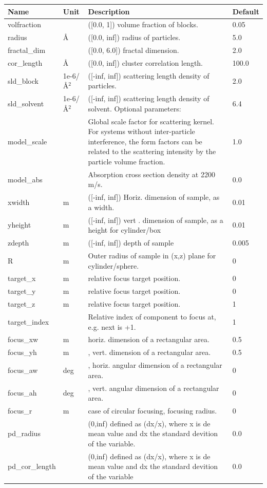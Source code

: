 \begin{longtable}{p{}p{}p{}p{}}
\toprule
\textbf{Name} & \textbf{Unit} & \textbf{Description} & \textbf{Default} \\
\midrule
\endhead
volfraction &  & ([0.0, 1]) volume fraction of blocks. & 0.05 \\
radius & \AA{} & ([0.0, inf]) radius of particles. & 5.0 \\
fractal\_dim &  & ([0.0, 6.0]) fractal dimension. & 2.0 \\
cor\_length & \AA{} & ([0.0, inf]) cluster correlation length. & 100.0 \\
sld\_block & 1e-6/\AA{}$^{2}$ & ([-inf, inf]) scattering length density of particles. & 2.0 \\
sld\_solvent & 1e-6/\AA{}$^{2}$ & ([-inf, inf]) scattering length density of solvent. Optional parameters: & 6.4 \\
model\_scale &   & Global scale factor for scattering kernel. For systems without inter-particle interference, the form factors can be related to the scattering intensity by the particle volume fraction. & 1.0 \\
model\_abs &   & Absorption cross section density at 2200 m/s. & 0.0 \\
xwidth & m & ([-inf, inf]) Horiz. dimension of sample, as a width. & 0.01 \\
yheight & m & ([-inf, inf]) vert . dimension of sample, as a height for cylinder/box & 0.01 \\
zdepth & m & ([-inf, inf]) depth of sample & 0.005 \\
R & m & Outer radius of sample in (x,z) plane for cylinder/sphere. & 0 \\
target\_x & m & relative focus target position. & 0 \\
target\_y & m & relative focus target position. & 0 \\
target\_z & m & relative focus target position. & 1 \\
target\_index &   & Relative index of component to focus at, e.g. next is +1. & 1 \\
focus\_xw & m & horiz. dimension of a rectangular area. & 0.5 \\
focus\_yh & m & , vert. dimension of a rectangular area. & 0.5 \\
focus\_aw & deg & , horiz. angular dimension of a rectangular area. & 0 \\
focus\_ah & deg & , vert. angular dimension of a rectangular area. & 0 \\
focus\_r & m & case of circular focusing, focusing radius. & 0 \\
pd\_radius &  & (0,inf) defined as (dx/x), where x is de mean value and dx the standard devition of the variable. & 0.0 \\
pd\_cor\_length &  & (0,inf) defined as (dx/x), where x is de mean value and dx the standard devition of the variable & 0.0 \\
\bottomrule
\end{longtable}

